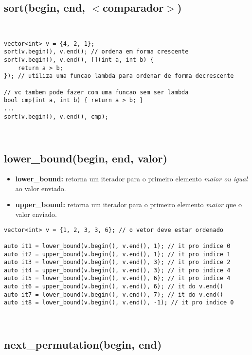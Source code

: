 \subsection{sort(begin, end, $<$comparador$>$)}

\ 

\begin{lstlisting}
vector<int> v = {4, 2, 1};
sort(v.begin(), v.end(); // ordena em forma crescente
sort(v.begin(), v.end(), [](int a, int b) {
	return a > b;
}); // utiliza uma funcao lambda para ordenar de forma decrescente

// vc tambem pode fazer com uma funcao sem ser lambda
bool cmp(int a, int b) { return a > b; }
...
sort(v.begin(), v.end(), cmp); 
\end{lstlisting}

\ 

\subsection{lower\_bound(begin, end, valor)}

\begin{itemize}[noitemsep]
\item \textbf{lower\_bound:} retorna um iterador para o primeiro elemento \textit{maior ou igual} ao valor enviado.
\item \textbf{upper\_bound:} retorna um iterador para o primeiro elemento \textit{maior} que o valor enviado.
\end{itemize}

\begin{lstlisting}
vector<int> v = {1, 2, 3, 3, 6}; // o vetor deve estar ordenado

auto it1 = lower_bound(v.begin(), v.end(), 1); // it pro indice 0
auto it2 = upper_bound(v.begin(), v.end(), 1); // it pro indice 1
auto it3 = lower_bound(v.begin(), v.end(), 3); // it pro indice 2
auto it4 = upper_bound(v.begin(), v.end(), 3); // it pro indice 4
auto it5 = lower_bound(v.begin(), v.end(), 6); // it pro indice 4
auto it6 = upper_bound(v.begin(), v.end(), 6); // it do v.end()
auto it7 = lower_bound(v.begin(), v.end(), 7); // it do v.end()
auto it8 = lower_bound(v.begin(), v.end(), -1); // it pro indice 0
\end{lstlisting}

\ 
    
\subsection{next\_permutation(begin, end)}

